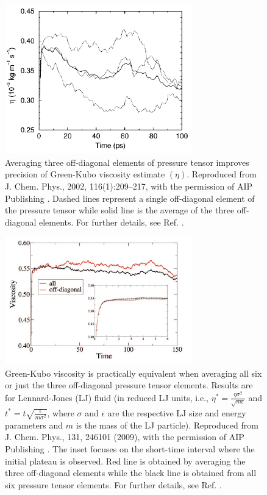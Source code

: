 \documentclass[9pt,bestpractices]{livecoms}
\begin{document}
\begin{figure}[htb!]
	\centering
	\includegraphics[width=3.2in]{HessFig5.png}
	\caption{Averaging three off-diagonal elements of pressure tensor improves precision of Green-Kubo viscosity estimate $(\eta)$. Reproduced from J. Chem. Phys., 2002, 116(1):209--217, with the permission of AIP Publishing \cite{Hess2002}. Dashed lines represent a single off-diagonal element of the pressure tensor while solid line is the average of the three off-diagonal elements. For further details, see Ref. \cite{Hess2002}.}
	\label{fig:HessFig5}
\end{figure}

\begin{figure}[htb!]
	\centering
	\includegraphics[width=3.2in]{ChenFig1.png}
	\caption{Green-Kubo viscosity is practically equivalent when averaging all six or just the three off-diagonal pressure tensor elements. Results are for Lennard-Jones (LJ) fluid (in reduced LJ units, i.e., $\eta^* = \frac{\eta \sigma^2}{\sqrt{m \epsilon}}$ and $t^* = t \sqrt{\frac{\epsilon}{m \sigma^2}}$, where $\sigma$ and $\epsilon$ are the respective LJ size and energy parameters and $m$ is the mass of the LJ particle). Reproduced from J. Chem. Phys., 131, 246101 (2009), with the permission of AIP Publishing \cite{Chen2009}. The inset focuses on the short-time interval where the initial plateau is observed. Red line is obtained by averaging the three off-diagonal elements while the black line is obtained from all six pressure tensor elements. For further details, see Ref. \cite{Chen2009}.}
	\label{fig:ChenFig1}
\end{figure}
\end{document}
